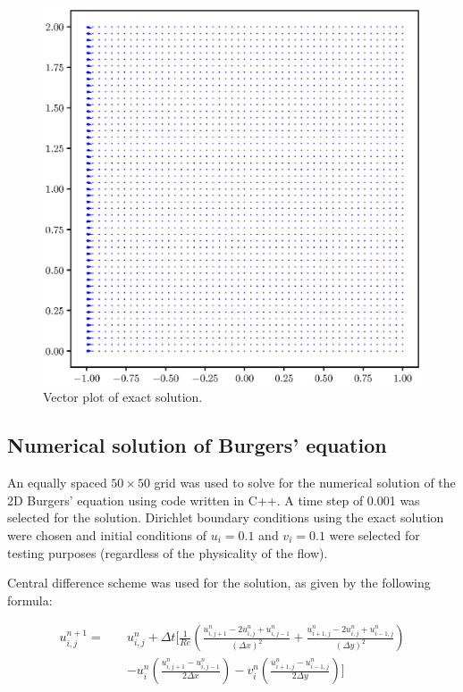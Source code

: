 \documentclass[12pt,a4paper,fleqn]{article}
\begin{document}
\begin{figure}[t!]
\centering
\includegraphics[width=\linewidth]{analytical.eps}
\caption{Vector plot of exact solution.}
\end{figure}

\subsection*{Numerical solution of Burgers' equation}
An equally spaced $50 \times 50$ grid was used to solve for the numerical
solution of the 2D Burgers' equation using code written in C++. A time step of
0.001 was selected for the solution. Dirichlet boundary conditions using the
exact solution were chosen and initial conditions of $u_i = 0.1$ and $v_i = 0.1$
were selected for testing purposes (regardless of the physicality of the flow).

Central difference scheme was used for the solution, as given by the following
formula:

\begin{equation}
\begin{split}
u_{i,j}^{n+1}=\quad &u_{i,j}^n + \Delta t
\bigg[\frac{1}{Re}\left(\frac{u_{i,j+1}^n - 2u_{i,j}^n + u_{i,j-1}^n}{(\Delta
x)^2} + \frac{u_{i+1,j}^n - 2u_{i,j}^n + u_{i-1,j}^n}{(\Delta y)^2}\right)
\\&- u_i^n\left(\frac{u_{i,j+1}^n - u_{i,j-1}^n}{2\Delta x}\right) -
v_i^n\left(\frac{u_{i+1,j}^n - u_{i-1,j}^n}{2\Delta y} \right) \bigg]
\end{split}
\end{equation}
\end{document}

